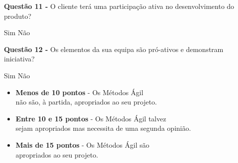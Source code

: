 \begin{framed}
\vspace{2mm}
\newline\textbf{Questão 11 - } O cliente terá uma participação ativa no desenvolvimento do produto?
\newline \begin{center} Sim \hspace{30mm} Não \end{center}
\vspace{2mm}
\newline\textbf{Questão 12 - } Os elementos da sua equipa são pró-ativos e demonstram iniciativa?
\newline \begin{center} Sim \hspace{30mm} Não\end{center}
\vspace{10mm}

\vspace{10mm}
\begin{center}
\begin{itemize}
    \item \textbf{Menos de 10 pontos} - Os Métodos Ágil \\não são, à partida, apropriados ao seu projeto.
    \item \textbf{Entre 10 e 15 pontos} - Os Métodos Ágil talvez \\sejam apropriados mas necessita de uma segunda opinião.
    \item \textbf{Mais de 15 pontos} - Os Métodos Ágil são\\ apropriados ao seu projeto.
\end{itemize}
\end{center}
\end{framed}

